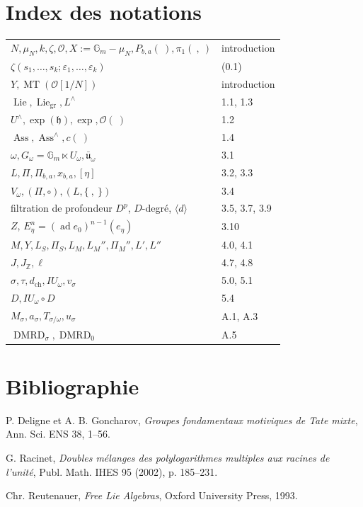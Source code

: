 \documentclass[10pt,a4paper]{article}
\newcommand{\Gm}{\mathbb G_m}
\newcommand{\Z}{\mathbb Z}
\newcommand{\Lie}{\operatorname{Lie}}
\newcommand{\Ass}{\operatorname{Ass}}
\newcommand{\MT}{\operatorname{MT}}
\newcommand{\ad}{\operatorname{ad}}
\newcommand{\OO}{\mathcal O}
\newcommand{\DMRD}{\operatorname{DMRD}}
\theoremstyle{deligne}
\begin{document}
\section*{Index des notations}

\begin{tabular}{ll}
\(N,\mu_N,k,\zeta,\OO,X:=\Gm-\mu_N,P_{b,a}(\ ),\pi_1(\ ,\ )\) & introduction\\
\(\zeta(s_1,\ldots,s_k;\varepsilon_1,\ldots,\varepsilon_k)\) & (0.1)\\
\(Y,\MT(\OO[1/N])\) & introduction\\
\(\Lie,\Lie_{\mathrm{gr}},L^\wedge\) & 1.1, 1.3\\
\(U^\wedge,\exp(\mathfrak h),\exp,\OO(\ )\) & 1.2\\
\(\Ass,\Ass^\wedge,c(\ )\) & 1.4\\
\(\omega,G_\omega=\Gm\ltimes U_\omega,\bar{\mathfrak u}_\omega\) & 3.1\\
\(L,\Pi,\Pi_{b,a},x_{b,a},[\eta]\) & 3.2, 3.3\\
\(V_\omega,(\Pi,\circ),(L,\{\ ,\ \})\) & 3.4\\
filtration de profondeur \(D^p\), \(D\)-degré, \(\langle d\rangle\) & 3.5, 3.7, 3.9\\
\(Z\), \(E_\eta^n=(\ad e_0)^{n-1}(e_\eta)\) & 3.10\\
\(M,Y,L_S,\Pi_S,L_M,L_M'',\Pi_M'',L',L''\) & 4.0, 4.1\\
\(J,J_\Z,\ell\) & 4.7, 4.8\\
\(\sigma,\tau,d_{\mathrm{ch}},IU_\omega,v_\sigma\) & 5.0, 5.1\\
\(D,IU_\omega\circ D\) & 5.4\\
\(M_\sigma,a_\sigma,T_{\sigma/\omega},u_\sigma\) & A.1, A.3\\
\(\DMRD_\sigma,\DMRD_0\) & A.5
\end{tabular}

\section*{Bibliographie}

\begin{enumerate}[label={[\arabic*]}]
\item P. Deligne et A. B. Goncharov, \emph{Groupes fondamentaux motiviques de Tate mixte}, Ann. Sci. ENS 38, 1--56.
\item G. Racinet, \emph{Doubles mélanges des polylogarithmes multiples aux racines de l'unité}, Publ. Math. IHES 95 (2002), p. 185--231.
\item Chr. Reutenauer, \emph{Free Lie Algebras}, Oxford University Press, 1993.
\end{enumerate}
\end{document}

